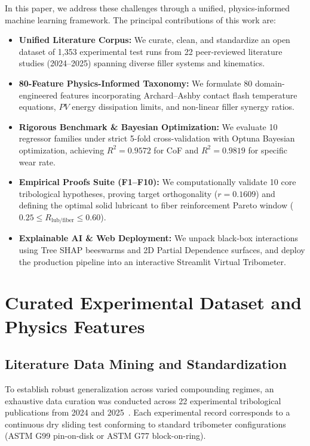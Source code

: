 \documentclass[10pt,twocolumn,a4paper]{article}
\begin{document}
In this paper, we address these challenges through a unified, physics-informed machine learning framework. The principal contributions of this work are:
\begin{itemize}
    \item \textbf{Unified Literature Corpus:} We curate, clean, and standardize an open dataset of 1,353 experimental test runs from 22 peer-reviewed literature studies (2024--2025) spanning diverse filler systems and kinematics.
    \item \textbf{80-Feature Physics-Informed Taxonomy:} We formulate 80 domain-engineered features incorporating Archard--Ashby contact flash temperature equations, $PV$ energy dissipation limits, and non-linear filler synergy ratios.
    \item \textbf{Rigorous Benchmark \& Bayesian Optimization:} We evaluate 10 regressor families under strict 5-fold cross-validation with Optuna Bayesian optimization, achieving $R^2 = 0.9572$ for CoF and $R^2 = 0.9819$ for specific wear rate.
    \item \textbf{Empirical Proofs Suite (F1--F10):} We computationally validate 10 core tribological hypotheses, proving target orthogonality ($r = 0.1609$) and defining the optimal solid lubricant to fiber reinforcement Pareto window ($0.25 \le R_{\text{lub/fiber}} \le 0.60$).
    \item \textbf{Explainable AI \& Web Deployment:} We unpack black-box interactions using Tree SHAP beeswarms and 2D Partial Dependence surfaces, and deploy the production pipeline into an interactive Streamlit Virtual Tribometer.
\end{itemize}

\section{Curated Experimental Dataset and Physics Features}
\label{sec:methodology}

\subsection{Literature Data Mining and Standardization}
To establish robust generalization across varied compounding regimes, an exhaustive data curation was conducted across 22 experimental tribological publications from 2024 and 2025~\cite{zaghloul2024abrasive,anjolleto2024graphite,bolat2024cfpa6,li2024gear,kumar2024mos2,srinivasa2024surface,siddikali2025fdm,zhang2025moisture,kumar2024gnpmos2,sun2024caso4,mohsenzadeh2025zeolite,barath2025humidity,sahin2024thermalaging,srinivas2024silane,unal2025castpa6,shibata2024pv,czerniec2025gears,sivakumar2025sprockets,wang2025hightemp,chen2025digitaltwin,martinez2024pa6ptfe,tariq2024nanoalumina}. Each experimental record corresponds to a continuous dry sliding test conforming to standard tribometer configurations (ASTM G99 pin-on-disk or ASTM G77 block-on-ring).
\end{document}
